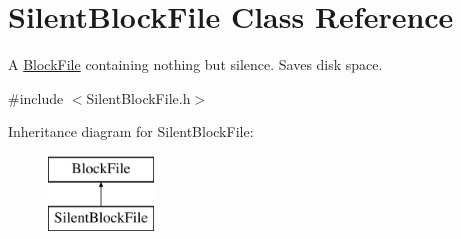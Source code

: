\hypertarget{class_silent_block_file}{}\section{Silent\+Block\+File Class Reference}
\label{class_silent_block_file}


A \hyperlink{class_block_file}{Block\+File} containing nothing but silence. Saves disk space.  




{\ttfamily \#include $<$Silent\+Block\+File.\+h$>$}

Inheritance diagram for Silent\+Block\+File\+:\begin{figure}[H]
\begin{center}
\leavevmode
\includegraphics[height=2.000000cm]{class_silent_block_file}
\end{center}
\end{figure}
